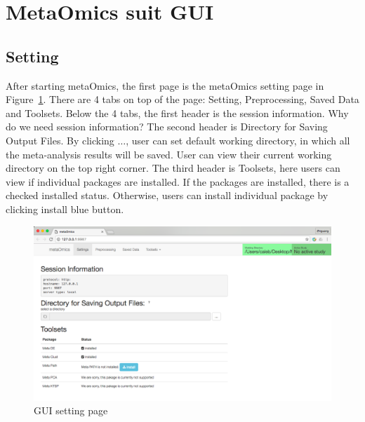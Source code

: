 \section{MetaOmics suit GUI}
\subsection{Setting}

After starting metaOmics, 
the first page is the metaOmics setting page in Figure~\ref{fig:GUIsetting}.  
There are 4 tabs on top of the page: Setting, Preprocessing, Saved Data and Toolsets.
Below the 4 tabs, 
the first header is the session information.
{
\color{red}
Why do we need session information?
}
The second header is Directory for Saving Output Files.
By clicking $\ldots$,
user can set default working directory, in which all the meta-analysis results will be saved.
User can view their current working directory on the top right corner.
The third header is Toolsets,
here users can view if individual packages are installed.
If the packages are installed, there is a checked installed status.
Otherwise, users can install individual package by clicking install blue button.

\begin{figure}[H]
\begin{center}
\includegraphics[scale=0.35]{./figure/GUIsetting}
\caption{GUI setting page}
\label{fig:GUIsetting}
\end{center}
\end{figure}

